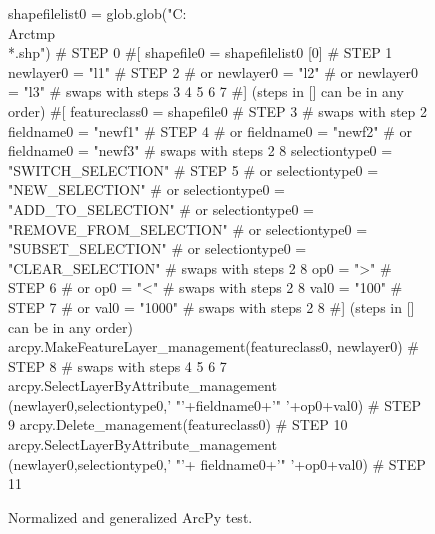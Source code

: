 \begin{figure}[t]
{\scriptsize 
\begin{code}
shapefilelist0 = glob.glob("C:\\Arctmp\\*.shp")                 \textcolor{black!60}{\# STEP 0}
\textcolor{black!60}{\#[}
shapefile0 = shapefilelist0 [0]                                   \textcolor{black!60}{\# STEP 1}
newlayer0 = "l1"                                                  \textcolor{black!60}{\# STEP 2}
\textcolor{black!60}{\#  or newlayer0 = "l2" }
\textcolor{black!60}{\#  or newlayer0 = "l3" }
\textcolor{black!60}{\#  swaps with steps 3 4 5 6 7}
\textcolor{black!60}{\#] (steps in [] can be in any order)}
\textcolor{black!60}{\#[}
featureclass0 = shapefile0                                        \textcolor{black!60}{\# STEP 3}
\textcolor{black!60}{\#  swaps with step 2}
fieldname0 = "newf1"                                              \textcolor{black!60}{\# STEP 4}
\textcolor{black!60}{\#  or fieldname0 = "newf2" }
\textcolor{black!60}{\#  or fieldname0 = "newf3" }
\textcolor{black!60}{\#  swaps with steps 2 8}
selectiontype0 = "SWITCH\_SELECTION"                               \textcolor{black!60}{\# STEP 5}
\textcolor{black!60}{\#  or selectiontype0 = "NEW\_SELECTION" }
\textcolor{black!60}{\#  or selectiontype0 = "ADD\_TO\_SELECTION" }
\textcolor{black!60}{\#  or selectiontype0 = "REMOVE\_FROM\_SELECTION"}
\textcolor{black!60}{\#  or selectiontype0 = "SUBSET\_SELECTION"}
\textcolor{black!60}{\#  or selectiontype0 = "CLEAR\_SELECTION"   }
\textcolor{black!60}{\#  swaps with steps 2 8}
op0 = ">"                                                         \textcolor{black!60}{\# STEP 6}
\textcolor{black!60}{\#  or op0 = "<" }
\textcolor{black!60}{\#  swaps with steps 2 8}
val0 = "100"                                                      \textcolor{black!60}{\# STEP 7}
\textcolor{black!60}{\#  or val0 = "1000" }
\textcolor{black!60}{\#  swaps with steps 2 8}
\textcolor{black!60}{\#] (steps in [] can be in any order)}
arcpy.MakeFeatureLayer\_management(featureclass0, newlayer0)    \textcolor{black!60}{\# STEP 8}
\textcolor{black!60}{\#  swaps with steps 4 5 6 7}
arcpy.SelectLayerByAttribute\_management
   (newlayer0,selectiontype0,' "'+fieldname0+'" '+op0+val0)    \textcolor{black!60}{\# STEP 9}
arcpy.Delete\_management(featureclass0)                             \textcolor{black!60}{\# STEP 10}
arcpy.SelectLayerByAttribute\_management
   (newlayer0,selectiontype0,' "'+ fieldname0+'" '+op0+val0) \textcolor{black!60}{\# STEP 11}
\end{code}
}
\caption{Normalized and generalized ArcPy test.}
\label{esrinormgen}
\end{figure}
